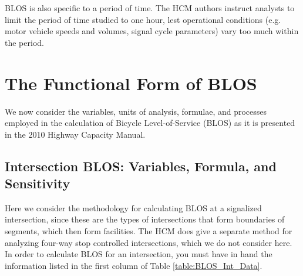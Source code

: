 \documentclass[11pt]{article} %
\begin{document}
BLOS is also specific to a period of time. The HCM authors instruct analysts to limit the period of time studied to one hour, lest operational conditions (e.g. motor vehicle speeds and volumes, signal cycle parameters) vary too much within the period.

\section{The Functional Form of BLOS}

We now consider the variables, units of analysis, formulae, and processes employed in the calculation of Bicycle Level-of-Service (BLOS) as it is presented in the 2010 Highway Capacity Manual. 

\subsection{Intersection BLOS: Variables, Formula, and Sensitivity}
Here we consider the methodology for calculating BLOS at a signalized intersection, since these are the types of intersections that form boundaries of segments, which then form facilities. The HCM does give a separate method for analyzing four-way stop controlled intersections, which we do not consider here. In order to calculate BLOS for an intersection, you must have in hand the information listed in the first column of Table \ref{table:BLOS_Int_Data}.
\end{document}
